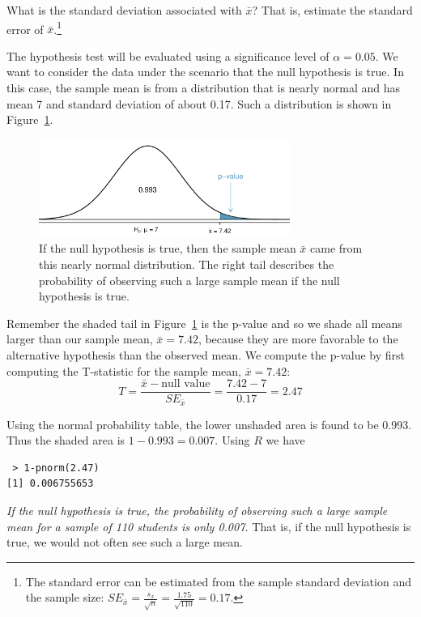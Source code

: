 \begin{exercise} \label{findSEOfFirstSleepStudyCheckingGreaterThan7Hours}
What is the standard deviation associated with $\bar{x}$? That is, estimate the standard error of $\bar{x}$.\footnote{The standard error can be estimated from the sample standard deviation and the sample size: $SE_{\bar{x}} = \frac{s_x}{\sqrt{n}} = \frac{1.75}{\sqrt{110}} = 0.17$.}
\end{exercise}

The hypothesis test will be evaluated using a significance level of $\alpha = 0.05$. We want to consider the data under the scenario that the null hypothesis is true. In this case, the sample mean is from a distribution that is nearly normal and has mean 7 and standard deviation of about 0.17. Such a distribution is shown in Figure~\ref{pValueOneSidedSleepStudy}. 

\begin{figure}[hht]
   \centering
   \includegraphics[width=0.73\textwidth]{ch_inference_foundations_oi_biostat/figures/pValueOneSidedSleepStudy/pValueOneSidedSleepStudybrfss}
   \caption{If the null hypothesis is true, then the sample mean $\bar{x}$ came from this nearly normal distribution. The right tail describes the probability of observing such a large sample mean if the null hypothesis is true.}
   \label{pValueOneSidedSleepStudy}
\end{figure}

Remember the shaded tail in Figure~\ref{pValueOneSidedSleepStudy} is the p-value and so we shade all means larger than our sample mean, $\bar{x} = 7.42$, because they are more favorable to the alternative hypothesis than the observed mean. We compute the p-value by first computing the T-statistic for the sample mean, $\bar{x} = 7.42$:
\[ T = \frac{\bar{x} - \text{null value}}{SE_{\bar{x}}} = \frac{7.42 - 7}{0.17} = 2.47\]

Using the normal probability table, the lower unshaded area is found to be 0.993. Thus the shaded area is $1-0.993 = 0.007$. Using $R$ we have
 \begin{verbatim} 
 > 1-pnorm(2.47)
[1] 0.006755653 
\end{verbatim}
{\em If the null hypothesis is true, the probability of observing such a large sample mean for a sample of 110 students is only 0.007.} That is, if the null hypothesis is true, we would not often see such a large mean.

